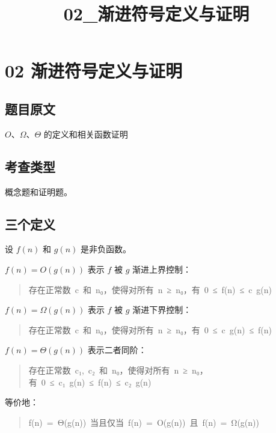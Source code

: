 \documentclass[UTF8,zihao=-4]{ctexart}
\title{02\_渐进符号定义与证明}
\author{}
\date{}
\begin{document}
\maketitle

\section*{02 渐进符号定义与证明}

\subsection*{题目原文}

$O$、$\Omega$、$\Theta$ 的定义和相关函数证明

\subsection*{考查类型}

概念题和证明题。

\subsection*{三个定义}

设 $f(n)$ 和 $g(n)$ 是非负函数。

$f(n) = O(g(n))$ 表示 $f$ 被 $g$ 渐进上界控制：

\begin{quote}
\small\ttfamily\raggedright
\relax 存在正常数\ c\ 和\ n₀，使得对所有\ n\ ≥\ n₀，有\ 0\ ≤\ f(n)\ ≤\ c\ g(n)\\
\end{quote}

$f(n) = \Omega(g(n))$ 表示 $f$ 被 $g$ 渐进下界控制：

\begin{quote}
\small\ttfamily\raggedright
\relax 存在正常数\ c\ 和\ n₀，使得对所有\ n\ ≥\ n₀，有\ 0\ ≤\ c\ g(n)\ ≤\ f(n)\\
\end{quote}

$f(n) = \Theta(g(n))$ 表示二者同阶：

\begin{quote}
\small\ttfamily\raggedright
\relax 存在正常数\ c₁,\ c₂\ 和\ n₀，使得对所有\ n\ ≥\ n₀，有\ 0\ ≤\ c₁\ g(n)\ ≤\ f(n)\ ≤\ c₂\ g(n)\\
\end{quote}

等价地：

\begin{quote}
\small\ttfamily\raggedright
\relax f(n)\ =\ Θ(g(n))\ 当且仅当\ f(n)\ =\ O(g(n))\ 且\ f(n)\ =\ Ω(g(n))\\
\end{quote}
\end{document}
